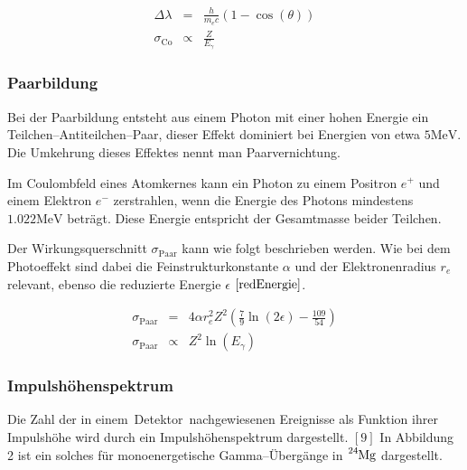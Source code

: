 \documentclass[12pt,a4paper]{scrartcl}
\numberwithin{equation}{section} %
\newcommand{\pu}[1]{\ensuremath{\mathrm{#1}}}
\renewcommand{\[}{} %
\renewcommand{\]}{\noindent} %
\begin{document}
\[
\begin{eqnarray}
    \Delta \lambda &=& \frac{h}{m_e c} (1 - \cos(\theta)) \\
    \sigma_\mathrm{Co} &\propto & \frac{Z}{E_\gamma}
\end{eqnarray}
\]

\hypertarget{paarbildung}{%
\subsubsection{Paarbildung}\label{paarbildung}}

Bei der Paarbildung entsteht aus einem Photon mit einer hohen Energie
ein Teilchen--Antiteilchen--Paar, dieser Effekt dominiert bei Energien
von etwa \(\pu{5 MeV}\). Die Umkehrung dieses Effektes nennt man
Paarvernichtung.

Im Coulombfeld eines Atomkernes kann ein Photon zu einem Positron
\(e^+\) und einem Elektron \(e^-\) zerstrahlen, wenn die Energie des
Photons mindestens \(\pu{1.022 MeV}\) beträgt. Diese Energie entspricht
der Gesamtmasse beider Teilchen.

Der Wirkungsquerschnitt \(\sigma_\mathrm{Paar}\) kann wie folgt
beschrieben werden. Wie bei dem Photoeffekt sind dabei die
Feinstrukturkonstante \(\alpha\) und der Elektronenradius \(r_e\)
relevant, ebenso die reduzierte Energie \(\epsilon\)
\(\eqref{redEnergie}\).

\[
\begin{eqnarray}
    \sigma_\mathrm{Paar}
        &=& 4\alpha r_e^2 Z^2
            \left(\frac{7}{9} \ln(2\epsilon) - \frac{109}{54} \right) \\
    \sigma_\mathrm{Paar}
        &\propto& Z^2 \ln(E_\gamma)
\end{eqnarray}
\]

\hypertarget{impulshuxf6henspektrum}{%
\subsubsection{Impulshöhenspektrum}\label{impulshuxf6henspektrum}}

Die Zahl der in einem~Detektor~nachgewiesenen Ereignisse als Funktion
ihrer Impulshöhe wird durch ein Impulshöhenspektrum dargestellt. \([9]\)
In Abbildung 2 ist ein solches für monoenergetische Gamma--Übergänge in
\(\ce{^{24}Mg}\) dargestellt.
\end{document}
